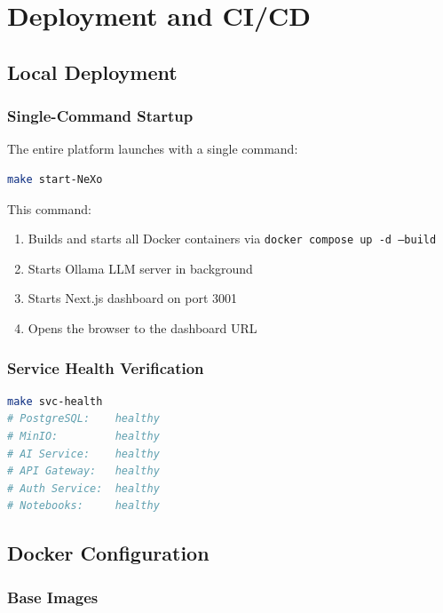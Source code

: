 \chapter{Deployment and CI/CD}
\label{ch:deployment}

\section{Local Deployment}

\subsection{Single-Command Startup}

The entire platform launches with a single command:

\begin{lstlisting}[language=bash, caption={Platform startup}]
make start-NeXo
\end{lstlisting}

This command:
\begin{enumerate}
    \item Builds and starts all Docker containers via \texttt{docker compose up -d --build}
    \item Starts Ollama LLM server in background
    \item Starts Next.js dashboard on port 3001
    \item Opens the browser to the dashboard URL
\end{enumerate}

\subsection{Service Health Verification}

\begin{lstlisting}[language=bash, caption={Health check}]
make svc-health
# PostgreSQL:    healthy
# MinIO:         healthy
# AI Service:    healthy
# API Gateway:   healthy
# Auth Service:  healthy
# Notebooks:     healthy
\end{lstlisting}

\section{Docker Configuration}

\subsection{Base Images}

